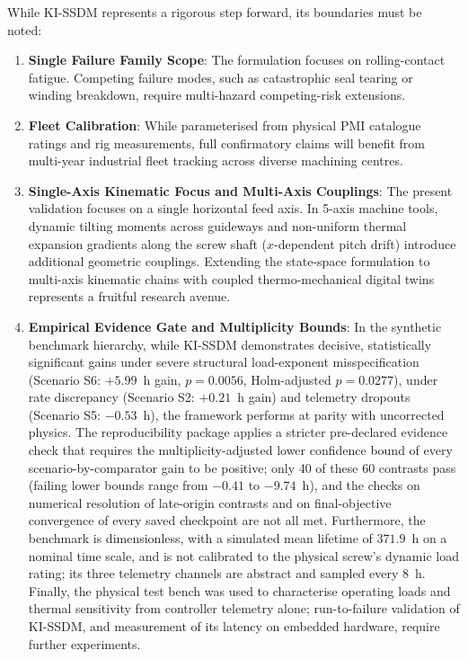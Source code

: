 \documentclass[a4paper,fleqn]{cas-dc}
\begin{document}
While KI-SSDM represents a rigorous step forward, its boundaries must be noted:
\begin{enumerate}[label=(\alph*),leftmargin=2.2em]
    \item \textbf{Single Failure Family Scope}: The formulation focuses on rolling-contact fatigue. Competing failure modes, such as catastrophic seal tearing or winding breakdown, require multi-hazard competing-risk extensions.
    \item \textbf{Fleet Calibration}: While parameterised from physical PMI catalogue ratings and rig measurements, full confirmatory claims will benefit from multi-year industrial fleet tracking across diverse machining centres.
    \item \textbf{Single-Axis Kinematic Focus and Multi-Axis Couplings}: The present validation focuses on a single horizontal feed axis. In 5-axis machine tools, dynamic tilting moments across guideways and non-uniform thermal expansion gradients along the screw shaft ($x$-dependent pitch drift) introduce additional geometric couplings. Extending the state-space formulation to multi-axis kinematic chains with coupled thermo-mechanical digital twins represents a fruitful research avenue.
    \item \textbf{Empirical Evidence Gate and Multiplicity Bounds}: In the synthetic benchmark hierarchy, while KI-SSDM demonstrates decisive, statistically significant gains under severe structural load-exponent misspecification (Scenario S6: $+5.99$~h gain, $p = 0.0056$, Holm-adjusted $p = 0.0277$), under rate discrepancy (Scenario S2: $+0.21$~h gain) and telemetry dropouts (Scenario S5: $-0.53$~h), the framework performs at parity with uncorrected physics. The reproducibility package applies a stricter pre-declared evidence check that requires the multiplicity-adjusted lower confidence bound of every scenario-by-comparator gain to be positive; only 40 of these 60 contrasts pass (failing lower bounds range from $-0.41$ to $-9.74$~h), and the checks on numerical resolution of late-origin contrasts and on final-objective convergence of every saved checkpoint are not all met. Furthermore, the benchmark is dimensionless, with a simulated mean lifetime of $371.9$~h on a nominal time scale, and is not calibrated to the physical screw's dynamic load rating; its three telemetry channels are abstract and sampled every 8~h. Finally, the physical test bench was used to characterise operating loads and thermal sensitivity from controller telemetry alone; run-to-failure validation of KI-SSDM, and measurement of its latency on embedded hardware, require further experiments.
\end{enumerate}
\end{document}
